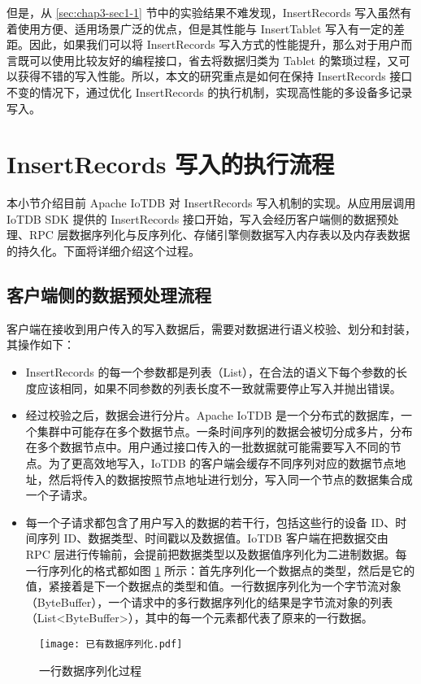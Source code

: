 但是，从 \ref{sec:chap3-sec1-1} 节中的实验结果不难发现，InsertRecords 写入虽然有着使用方便、适用场景广泛的优点，但是其性能与 InsertTablet 写入有一定的差距。因此，如果我们可以将 InsertRecords 写入方式的性能提升，那么对于用户而言既可以使用比较友好的编程接口，省去将数据归类为 Tablet 的繁琐过程，又可以获得不错的写入性能。所以，本文的研究重点是如何在保持 InsertRecords 接口不变的情况下，通过优化 InsertRecords 的执行机制，实现高性能的多设备多记录写入。


\section{InsertRecords 写入的执行流程\label{sec:chap3-sec2}}
本小节介绍目前 Apache IoTDB 对 InsertRecords 写入机制的实现。从应用层调用 IoTDB SDK 提供的 InsertRecords 接口开始，写入会经历客户端侧的数据预处理、RPC 层数据序列化与反序列化、存储引擎侧数据写入内存表以及内存表数据的持久化。下面将详细介绍这个过程。
\subsection{客户端侧的数据预处理流程}
客户端在接收到用户传入的写入数据后，需要对数据进行语义校验、划分和封装，其操作如下：
\begin{itemize}
  \item InsertRecords 的每一个参数都是列表（List），在合法的语义下每个参数的长度应该相同，如果不同参数的列表长度不一致就需要停止写入并抛出错误。
  \item 经过校验之后，数据会进行分片。Apache IoTDB 是一个分布式的数据库，一个集群中可能存在多个数据节点。一条时间序列的数据会被切分成多片，分布在多个数据节点中\cite{wang2023apache}。用户通过接口传入的一批数据就可能需要写入不同的节点。为了更高效地写入，IoTDB 的客户端会缓存不同序列对应的数据节点地址，然后将传入的数据按照节点地址进行划分，写入同一个节点的数据集合成一个子请求。
  \item 每一个子请求都包含了用户写入的数据的若干行，包括这些行的设备 ID、时间序列 ID、数据类型、时间戳以及数据值。IoTDB 客户端在把数据交由 RPC 层进行传输前，会提前把数据类型以及数据值序列化为二进制数据。每一行序列化的格式都如图 \ref{fig:curr-line-serialize-format} 所示：首先序列化一个数据点的类型，然后是它的值，紧接着是下一个数据点的类型和值。一行数据序列化为一个字节流对象（ByteBuffer），一个请求中的多行数据序列化的结果是字节流对象的列表（List<ByteBuffer>），其中的每一个元素都代表了原来的一行数据。
\end{itemize}

\begin{figure}
  \centering
  \texttt{[image: 已有数据序列化.pdf]}
  \caption{一行数据序列化过程}
  \label{fig:curr-line-serialize-format}
\end{figure}

